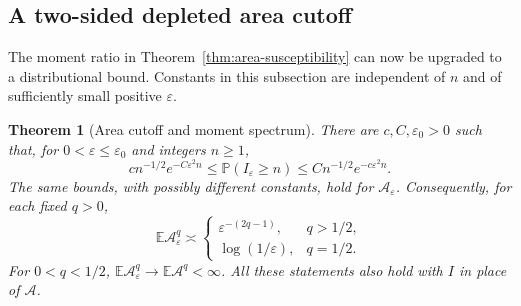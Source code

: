 \documentclass[11pt]{article}
\numberwithin{equation}{section}
\newtheorem{theorem}{Theorem}[section]
\theoremstyle{definition}
\newcommand{\E}{\mathbb E}
\newcommand{\Prob}{\mathbb P}
\begin{document}
\subsection{A two-sided depleted area cutoff}\label{sec:area-cutoff}
The moment ratio in Theorem~\ref{thm:area-susceptibility} can now be upgraded to a distributional bound. Constants in this subsection are independent of $n$ and of sufficiently small positive $\varepsilon$.

\begin{theorem}[Area cutoff and moment spectrum]\label{thm:area-cutoff}
There are $c,C,\varepsilon_0>0$ such that, for $0<\varepsilon\le\varepsilon_0$ and integers $n\ge1$,
\begin{equation}\label{eq:area-cutoff}
 c n^{-1/2}e^{-C\varepsilon^2 n}
 \le\Prob(I_\varepsilon\ge n)
 \le C n^{-1/2}e^{-c\varepsilon^2 n}.
\end{equation}
The same bounds, with possibly different constants, hold for $\mathcal A_\varepsilon$. Consequently, for each fixed $q>0$,
\begin{equation}\label{eq:area-moment-spectrum}
 \E\mathcal A_\varepsilon^q\asymp
 \begin{cases}
 \varepsilon^{-(2q-1)},&q>1/2,\\
 \log(1/\varepsilon),&q=1/2.
 \end{cases}
\end{equation}
For $0<q<1/2$, $\E\mathcal A_\varepsilon^q\to\E\mathcal A^q<\infty$. All these statements also hold with $I$ in place of $\mathcal A$.
\end{theorem}
\end{document}
